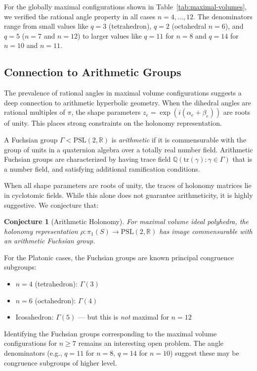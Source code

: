 \documentclass[11pt]{article}
\newtheorem{conjecture}{Conjecture}
\begin{document}
For the globally maximal configurations shown in Table~\ref{tab:maximal-volumes}, we verified the rational angle property in all cases $n = 4, \ldots, 12$. The denominators range from small values like $q = 3$ (tetrahedron), $q = 2$ (octahedral $n=6$), and $q = 5$ ($n=7$ and $n=12$) to larger values like $q = 11$ for $n=8$ and $q = 14$ for $n = 10$ and $n=11$.

\subsection{Connection to Arithmetic Groups}

The prevalence of rational angles in maximal volume configurations suggests a deep connection to arithmetic hyperbolic geometry. When the dihedral angles are rational multiples of $\pi$, the shape parameters $z_e = \exp(i(\alpha_e + \beta_e))$ are roots of unity. This places strong constraints on the holonomy representation.

A Fuchsian group $\Gamma < \mathrm{PSL}(2,\mathbb{R})$ is \emph{arithmetic} if it is commensurable with the group of units in a quaternion algebra over a totally real number field. Arithmetic Fuchsian groups are characterized by having trace field $\mathbb{Q}(\mathrm{tr}(\gamma) : \gamma \in \Gamma)$ that is a number field, and satisfying additional ramification conditions.

When all shape parameters are roots of unity, the traces of holonomy matrices lie in cyclotomic fields. While this alone does not guarantee arithmeticity, it is highly suggestive. We conjecture that:

\begin{conjecture}[Arithmetic Holonomy]
For maximal volume ideal polyhedra, the holonomy representation $\rho: \pi_1(S) \to \mathrm{PSL}(2,\mathbb{R})$ has image commensurable with an arithmetic Fuchsian group.
\end{conjecture}

For the Platonic cases, the Fuchsian groups are known principal congruence subgroups:
\begin{itemize}
    \item $n=4$ (tetrahedron): $\Gamma(3)$
    \item $n=6$ (octahedron): $\Gamma(4)$
    \item Icosahedron: $\Gamma(5)$ --- but this is \emph{not} maximal for $n=12$
\end{itemize}
Identifying the Fuchsian groups corresponding to the maximal volume configurations for $n \geq 7$ remains an interesting open problem. The angle denominators (e.g., $q=11$ for $n=8$, $q=14$ for $n=10$) suggest these may be congruence subgroups of higher level.
\end{document}
